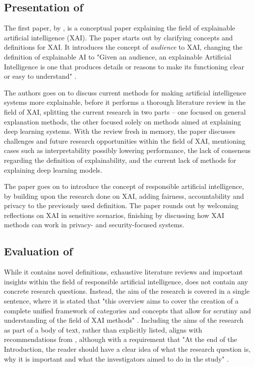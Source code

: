 \subsection[Presentation of Barredo Arrieta et al. (2020)]{Presentation of \textcite{Barredo_2020}}
The first paper,  by \textcite{Barredo_2020}, is a conceptual paper explaining the field of explainable artificial intelligence (XAI). The paper starts out by clarifying concepts and definitions for XAI. It introduces the concept of \textit{audience} to XAI, changing the definition of explainable AI to "Given an audience, an explainable Artificial Intelligence is one that produces details or reasons to make its functioning clear or easy to understand" \parencite[p.85]{Barredo_2020}.

The authors goes on to discuss current methods for making artificial intelligence systems more explainable, before it performs a thorough literature review in the field of XAI, splitting the current research in two parts -- one focused on general explanation methods, the other focused solely on methods aimed at explaining deep learning systems. With the review fresh in memory, the paper discusses challenges and future research opportunities within the field of XAI, mentioning cases such as interpretability possibly lowering performance, the lack of consensus regarding the definition of explainability, and the current lack of methods for explaining deep learning models.

The paper goes on to introduce the concept of responsible artificial intelligence, by building upon the research done on XAI, adding fairness, accountability and privacy to the previously used definition. The paper rounds out by welcoming reflections on XAI in sensitive scenarios, finishing by discussing how XAI methods can work in privacy- and security-focused systems.



\subsection[Evaluation of Barredo Arrieta et al. (2020)]{Evaluation of \textcite{Barredo_2020}}
While it contains novel definitions, exhaustive literature reviews and important insights within the field of responsible artificial intelligence, \textcite{Barredo_2020} does not contain any concrete research questions. Instead, the aim of the research is covered in a single sentence, where it is stated that "this overview aims to cover the creation of a complete unified framework of categories and concepts that allow for scrutiny and understanding of the field of XAI methods" \parencite[p.83]{Barredo_2020}. Including the aims of the research as part of a body of text, rather than explicitly listed, aligns with recommendations from \textcite[p.359]{Davidson_2012}, although with a requirement that "At the end of the Introduction, the reader should have a clear idea of what the research question is, why it is important and what the investigators aimed to do in the study" \parencite[p.360]{Davidson_2012}.

